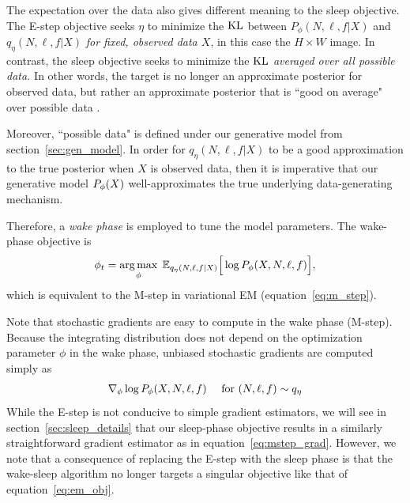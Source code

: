 The expectation over the data also gives different meaning to the sleep objective. The E-step objective seeks $\eta$ to minimize the $\textrm{KL}$ between $P_\phi(N, \ell, f | X)$ and $q_\eta(N, \ell, f | X)$ {\itshape for fixed, observed data $X$},
in this case the $H\times W$ image. In contrast, the sleep objective seeks to minimize the $\textrm{KL}$ {\itshape averaged over all possible data. } In other words, the target is no longer an approximate posterior for observed data, but rather an approximate posterior that is ``good on average" over possible data .

Moreover, ``possible data" is defined under our generative model from section~\ref{sec:gen_model}. In order for $q_\eta(N, \ell, f | X)$ to be a good approximation to
the true posterior when $X$ is observed data, then it is imperative that our generative model $P_\phi(X)$ well-approximates the true underlying data-generating mechanism. 

Therefore, a {\itshape wake phase} is employed to tune the model parameters. The wake-phase objective is
\begin{align}
    \phi_{t} = \operatorname*{arg\,max}_{\phi} \; \mathbb{E}_{q_{\eta}(N, \ell, f | X)}\Big[\log P_\phi(X, N, \ell, f)\Big], 
    \label{eq:wake_elbo}
\end{align}
which is equivalent to the M-step in variational EM (equation~\ref{eq:m_step}). 

Note that stochastic gradients are easy to compute in the wake phase (M-step). Because the integrating distribution does not depend on the optimization parameter $\phi$ in the wake phase, unbiased stochastic gradients are computed simply as 
\begin{align}
    \nabla_\phi \log P_\phi(X, N, \ell, f) \quad \text{ for } (N, \ell, f)\sim q_\eta
    \label{eq:mstep_grad}
\end{align}
While the E-step is not conducive to simple gradient estimators, we will see in section~\ref{sec:sleep_details} that our sleep-phase objective
results in a similarly straightforward gradient estimator as in equation~\eqref{eq:mstep_grad}. However,
we note that a consequence of replacing the E-step with the sleep phase is that the wake-sleep algorithm no longer targets a singular objective like that of equation~\eqref{eq:em_obj}. 


